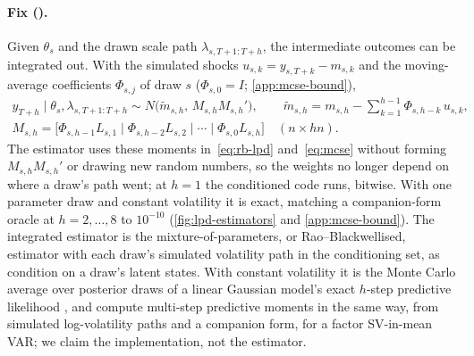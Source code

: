 \paragraph{Fix ().}%
Given $\theta_s$ and the drawn scale path $\lambda_{s,T+1:T+h}$, the intermediate outcomes can be
integrated out.
With the simulated shocks $u_{s,k} = y_{s,T+k} - m_{s,k}$ and the moving-average coefficients
$\Phi_{s,j}$ of draw $s$ ($\Phi_{s,0} = I$; \cref{app:mcse-bound}),
\begin{equation}\label{eq:integrated}
\begin{gathered}
  y_{T+h} \mid \theta_s, \lambda_{s,T+1:T+h} \sim N\bigl(\tilde m_{s,h},\, M_{s,h}M_{s,h}'\bigr),\qquad
  \tilde m_{s,h} = m_{s,h} - \sum_{k=1}^{h-1}\Phi_{s,h-k}\,u_{s,k},\\
  M_{s,h} = \bigl[\Phi_{s,h-1}L_{s,1} \mid \Phi_{s,h-2}L_{s,2} \mid \cdots \mid \Phi_{s,0}L_{s,h}\bigr]
  \quad (n \times hn).
\end{gathered}
\end{equation}
The estimator uses these moments in~\eqref{eq:rb-lpd} and~\eqref{eq:mcse} without forming
$M_{s,h}M_{s,h}'$ or drawing new random numbers, so the weights no longer depend on where a draw's
path went; at $h = 1$ the conditioned code runs, bitwise.
With one parameter draw and constant volatility it is exact, matching a companion-form oracle at
$h = 2, \dots, 8$ to $10^{-10}$ (\cref{fig:lpd-estimators} and \cref{app:mcse-bound}).
The integrated estimator is the mixture-of-parameters, or Rao--Blackwellised, estimator
\citep[Section~2.1]{kruger2021predictive} with each draw's simulated volatility path in the
conditioning set, as \citet[Section~5.2]{kruger2021predictive} condition on a draw's latent states.
With constant volatility it is the Monte Carlo average over posterior draws of a linear Gaussian
model's exact $h$-step predictive likelihood \citep{warne2017marginalized}, and
\citet[Appendix~D]{hiraki2026dynamic} compute multi-step predictive moments in the same way, from
simulated log-volatility paths and a companion form, for a factor SV-in-mean VAR; we claim the
implementation, not the estimator.
